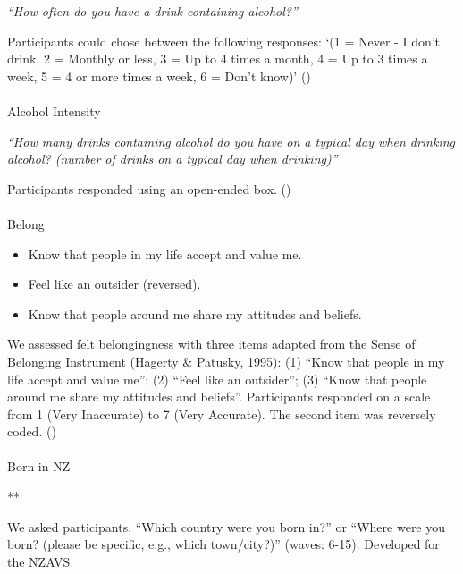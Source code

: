 \documentclass[
  single column]{article}
\makeatletter
\let\oldparagraph\paragraph
\renewcommand{\paragraph}{
    \@ifstar
      \xxxParagraphStar
      \xxxParagraphNoStar
  }
\newcommand{\xxxParagraphStar}[1]{\oldparagraph*{#1}\mbox{}}
\newcommand{\xxxParagraphNoStar}[1]{\oldparagraph{#1}\mbox{}}
\providecommand{\tightlist}{%
  \setlength{\itemsep}{0pt}\setlength{\parskip}{0pt}}\usepackage{longtable,booktabs,array}
\makeatother
\begin{document}
\emph{``How often do you have a drink containing alcohol?''}

Participants could chose between the following responses: `(1 = Never -
I don't drink, 2 = Monthly or less, 3 = Up to 4 times a month, 4 = Up to
3 times a week, 5 = 4 or more times a week, 6 = Don't know)'
()

\paragraph{Alcohol Intensity}\label{alcohol-intensity}

\emph{``How many drinks containing alcohol do you have on a typical day
when drinking alcohol? (number of drinks on a typical day when
drinking)''}

Participants responded using an open-ended box.
()

\paragraph{Belong}\label{belong}

\begin{itemize}
\tightlist
\item
  Know that people in my life accept and value me.
\item
  Feel like an outsider (reversed).
\item
  Know that people around me share my attitudes and beliefs.
\end{itemize}

We assessed felt belongingness with three items adapted from the Sense
of Belonging Instrument (Hagerty \& Patusky, 1995): (1) ``Know that
people in my life accept and value me''; (2) ``Feel like an outsider'';
(3) ``Know that people around me share my attitudes and beliefs''.
Participants responded on a scale from 1 (Very Inaccurate) to 7 (Very
Accurate). The second item was reversely coded.
()

\paragraph{Born in NZ}\label{born-in-nz}

**

We asked participants, ``Which country were you born in?'' or ``Where
were you born? (please be specific, e.g., which town/city?)'' (waves:
6-15). Developed for the NZAVS.
\end{document}

